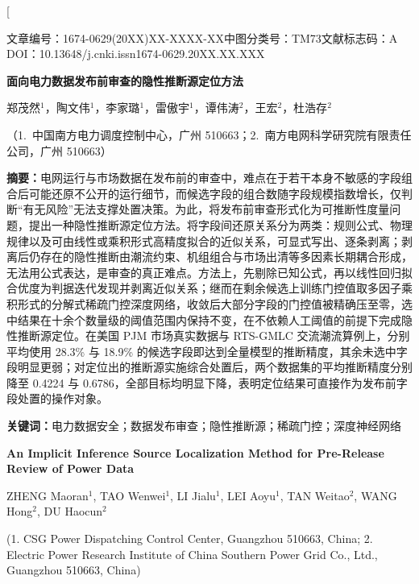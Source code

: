 \documentclass[UTF8,zihao=5,twoside]{ctexart}
\newcommand{\articleinfo}{文章编号：1674-0629(20XX)XX-XXXX-XX\quad 中图分类号：TM73\quad 文献标志码：A\\
DOI：10.13648/j.cnki.issn1674-0629.20XX.XX.XXX}
\begin{document}
\twocolumn[

\begin{center}
{\articleinfo}\par\vspace{1.0em}
{\sffamily{}\bfseries 面向电力数据发布前审查的隐性推断源定位方法}\par\vspace{0.8em}
{郑茂然$^{1}$，陶文伟$^{1}$，李家璐$^{1}$，雷傲宇$^{1}$，谭伟涛$^{2}$，王宏$^{2}$，杜浩存$^{2}$}\par\vspace{0.4em}
{（1.~中国南方电力调度控制中心，广州 510663；2.~南方电网科学研究院有限责任公司，广州 510663）}\par\vspace{0.8em}
\end{center}

\noindent\textbf{摘要：}电网运行与市场数据在发布前的审查中，难点在于若干本身不敏感的字段组合后可能还原不公开的运行细节，而候选字段的组合数随字段规模指数增长，仅判断“有无风险”无法支撑处置决策。为此，将发布前审查形式化为可推断性度量问题，提出一种隐性推断源定位方法。将字段间还原关系分为两类：规则公式、物理规律以及可由线性或乘积形式高精度拟合的近似关系，可显式写出、逐条剥离；剥离后仍存在的隐性推断由潮流约束、机组组合与市场出清等多因素长期耦合形成，无法用公式表达，是审查的真正难点。方法上，先剔除已知公式，再以线性回归拟合优度为判据迭代发现并剥离近似关系；继而在剩余候选上训练门控值取多因子乘积形式的分解式稀疏门控深度网络，收敛后大部分字段的门控值被精确压至零，选中结果在十余个数量级的阈值范围内保持不变，在不依赖人工阈值的前提下完成隐性推断源定位。在美国 PJM 市场真实数据与 RTS-GMLC 交流潮流算例上，分别平均使用 28.3\% 与 18.9\% 的候选字段即达到全量模型的推断精度，其余未选中字段明显更弱；对定位出的推断源实施综合处置后，两个数据集的平均推断精度分别降至 0.4224 与 0.6786，全部目标均明显下降，表明定位结果可直接作为发布前字段处置的操作对象。\par
\noindent\textbf{关键词：}电力数据安全；数据发布审查；隐性推断源；稀疏门控；深度神经网络\par\vspace{0.8em}

\begin{center}
{\bfseries\large An Implicit Inference Source Localization Method for Pre-Release Review of Power Data}\par\vspace{0.5em}
{ZHENG Maoran$^{1}$, TAO Wenwei$^{1}$, LI Jialu$^{1}$, LEI Aoyu$^{1}$, TAN Weitao$^{2}$, WANG Hong$^{2}$, DU Haocun$^{2}$}\par\vspace{0.3em}
{\small (1. CSG Power Dispatching Control Center, Guangzhou 510663, China; 2. Electric Power Research Institute of China Southern Power Grid Co., Ltd., Guangzhou 510663, China)}\par\vspace{0.5em}
\end{center}
\end{document}
